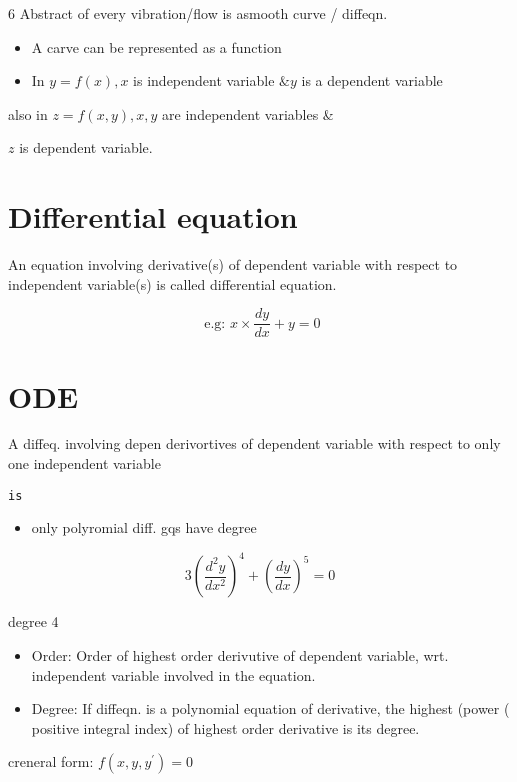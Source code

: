 \documentclass[12pt, a4paper]{article}
\begin{document}
 6 Abstract of every vibration/flow is asmooth curve / diffeqn.

\begin{itemize}
  \item A carve can be represented as a function
  \item In $y=f(x), x$ is independent variable $\& y$ is a dependent variable
\end{itemize}

also in $z=f(x, y), x, y$ are independent variables \&

$z$ is dependent variable.

\section*{Differential equation}
An equation involving derivative(s) of dependent variable with respect to independent variable(s) is called differential equation.

$$
\text { e.g: } x \times \frac{d y}{d x}+y=0
$$

\section*{ODE}
A diffeq. involving depen derivortives of dependent variable with respect to only one independent variable

\begin{verbatim}
is
\end{verbatim}

\begin{itemize}
  \item only polyromial diff. gqs have degree
\end{itemize}

$$
3\left(\frac{d^{2} y}{d x^{2}}\right)^{4}+\left(\frac{d y}{d x}\right)^{5}=0
$$

degree 4

\begin{itemize}
  \item Order: Order of highest order derivutive of dependent variable, wrt. independent variable involved in the equation.
  \item Degree: If diffeqn. is a polynomial equation of derivative, the highest (power ( positive integral index) of highest order derivative is its degree.
\end{itemize}

creneral form: $f\left(x, y, y^{\prime}\right)=0$
\end{document}
